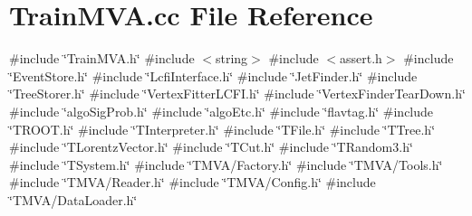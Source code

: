\section{Train\+M\+V\+A.\+cc File Reference}
\label{TrainMVA_8cc}
{\ttfamily \#include \char`\"{}Train\+M\+V\+A.\+h\char`\"{}}\newline
{\ttfamily \#include $<$string$>$}\newline
{\ttfamily \#include $<$assert.\+h$>$}\newline
{\ttfamily \#include \char`\"{}Event\+Store.\+h\char`\"{}}\newline
{\ttfamily \#include \char`\"{}Lcfi\+Interface.\+h\char`\"{}}\newline
{\ttfamily \#include \char`\"{}Jet\+Finder.\+h\char`\"{}}\newline
{\ttfamily \#include \char`\"{}Tree\+Storer.\+h\char`\"{}}\newline
{\ttfamily \#include \char`\"{}Vertex\+Fitter\+L\+C\+F\+I.\+h\char`\"{}}\newline
{\ttfamily \#include \char`\"{}Vertex\+Finder\+Tear\+Down.\+h\char`\"{}}\newline
{\ttfamily \#include \char`\"{}algo\+Sig\+Prob.\+h\char`\"{}}\newline
{\ttfamily \#include \char`\"{}algo\+Etc.\+h\char`\"{}}\newline
{\ttfamily \#include \char`\"{}flavtag.\+h\char`\"{}}\newline
{\ttfamily \#include \char`\"{}T\+R\+O\+O\+T.\+h\char`\"{}}\newline
{\ttfamily \#include \char`\"{}T\+Interpreter.\+h\char`\"{}}\newline
{\ttfamily \#include \char`\"{}T\+File.\+h\char`\"{}}\newline
{\ttfamily \#include \char`\"{}T\+Tree.\+h\char`\"{}}\newline
{\ttfamily \#include \char`\"{}T\+Lorentz\+Vector.\+h\char`\"{}}\newline
{\ttfamily \#include \char`\"{}T\+Cut.\+h\char`\"{}}\newline
{\ttfamily \#include \char`\"{}T\+Random3.\+h\char`\"{}}\newline
{\ttfamily \#include \char`\"{}T\+System.\+h\char`\"{}}\newline
{\ttfamily \#include \char`\"{}T\+M\+V\+A/\+Factory.\+h\char`\"{}}\newline
{\ttfamily \#include \char`\"{}T\+M\+V\+A/\+Tools.\+h\char`\"{}}\newline
{\ttfamily \#include \char`\"{}T\+M\+V\+A/\+Reader.\+h\char`\"{}}\newline
{\ttfamily \#include \char`\"{}T\+M\+V\+A/\+Config.\+h\char`\"{}}\newline
{\ttfamily \#include \char`\"{}T\+M\+V\+A/\+Data\+Loader.\+h\char`\"{}}\newline
